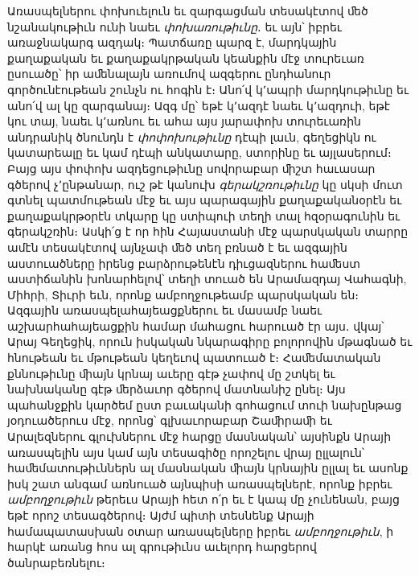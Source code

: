 \documentclass{article}
\begin{document}
{Առասպելներու փոխուելուն եւ զարգացման տեսակէտով ﬔծ նշանակութիւն ունի նաեւ \emph{փոխառութիւնը}․ եւ այն՝ իբրեւ առաջնակարգ ազդակ։ Պատճառը պարզ է, մարդկային քաղաքական եւ քաղաքակրթական կեանքին մէջ տուրեւառ ըսուածը՝ իր աﬔնալայն առումով ազգերու ընդհանուր գործունէութեան շունչն ու հոգին է։ Անո՛վ կ՚ապրի մարդկութիւնը եւ անո՛վ ալ կը զարգանայ։ Ազգ մը՝ եթէ կ՚ազդէ նաեւ կ՚ազդուի, եթէ կու տայ, նաեւ կ՚առնու եւ ահա այս յարափոխ տուրեւառին անդրանիկ ծնունդն է \emph{փոփոխութիւնը} դէպի լաւն, գեղեցիկն ու կատարեալը եւ կամ դէպի անկատարը, ստորինը եւ այլասերում։ Բայց այս փոփոխ ազդեցութիւնը սովորաբար ﬕշտ հաւասար գծերով չ՚ընթանար, ուշ թէ կանուխ \emph{գերակշռութիւնը} կը սկսի մուտ գտնել պատմութեան մէջ եւ այս պարագային քաղաքականօրէն եւ քաղաքակրթօրէն տկարը կը ստիպուի տեղի տալ հզօրագունին եւ գերակշռին։ Ասկի՛ց է որ հին Հայաստանի մէջ պարսկական տարրը ամէն տեսակէտով այնչափ ﬔծ տեղ բռնած է եւ ազգային աստուածները իրենց բարձրութենէն դիւցազներու հաﬔստ աստիճանին խոնարհելով՝ տեղի տուած են Արամազդայ Վահագնի, Միհրի, Տիւրի եւն, որոնք ամբողջութեամբ պարսկական են։ Ազգային առասպելահայեացքներու եւ մասամբ նաեւ աշխարհահայեացքին համար մահացու հարուած էր այս․ վկայ՝ Արայ Գեղեցիկ, որուն իսկական նկարագիրը բոլորովին մթագնած եւ հնութեան եւ մթութեան կեղեւով պատուած է։ Հաﬔմատական քննութիւնը ﬕայն կրնայ աւերը գէթ չափով մը շտկել եւ նախնականը գէթ ﬔրձաւոր գծերով մատնանիշ ընել։ Այս պահանջքին կարծեմ ըստ բաւականի գոհացում տուի նախընթաց յօդուածերուս մէջ, որոնց՝ գլխաւորաբար Շաﬕրաﬕ եւ Արալեզներու գլուխներու մէջ հարցը մասնական՝ այսինքն Արայի առասպելին այս կամ այն տեսագիծը որոշելու վրայ ըլլալուն՝ հաﬔմատութիւններն ալ մասնական ﬕայն կրնային ըլլալ եւ ասոնք իսկ շատ անգամ առնուած այնպիսի առասպելներէ, որոնք իբրեւ \emph{ամբողջութիւն} թերեւս Արայի հետ ո՛ր եւ է կապ մը չունենան, բայց եթէ որոշ տեսագծերով։ Այժմ պիտի տեսնենք Արայի համապատասխան օտար առասպելները իբրեւ \emph{ամբողջութիւն}, ի հարկէ առանց հոս ալ գրութիւնս աւելորդ հարցերով ծանրաբեռնելու։

}
\end{document}
